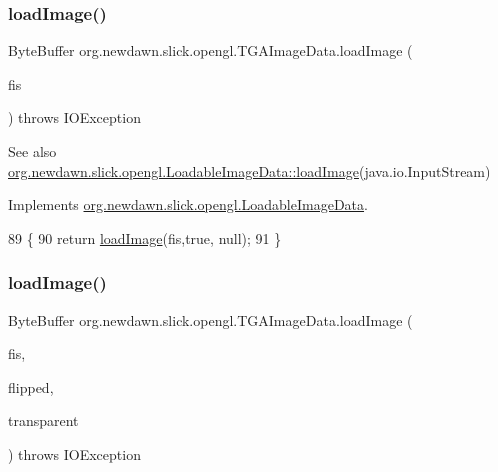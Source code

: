 \subsubsection{\texorpdfstring{load\+Image()}{loadImage()}\hspace{0.1cm}{\footnotesize\ttfamily [1/3]}}
{\footnotesize\ttfamily Byte\+Buffer org.\+newdawn.\+slick.\+opengl.\+T\+G\+A\+Image\+Data.\+load\+Image (\begin{DoxyParamCaption}\item[{Input\+Stream}]{fis }\end{DoxyParamCaption}) throws I\+O\+Exception\hspace{0.3cm}{\ttfamily [inline]}}

\begin{DoxySeeAlso}{See also}
\mbox{\hyperlink{interfaceorg_1_1newdawn_1_1slick_1_1opengl_1_1_loadable_image_data_a640021b955dde7deeeeabb5ac3738d2b}{org.\+newdawn.\+slick.\+opengl.\+Loadable\+Image\+Data\+::load\+Image}}(java.\+io.\+Input\+Stream) 
\end{DoxySeeAlso}


Implements \mbox{\hyperlink{interfaceorg_1_1newdawn_1_1slick_1_1opengl_1_1_loadable_image_data_a640021b955dde7deeeeabb5ac3738d2b}{org.\+newdawn.\+slick.\+opengl.\+Loadable\+Image\+Data}}.


\begin{DoxyCode}
89                                                                     \{
90         \textcolor{keywordflow}{return} \mbox{\hyperlink{classorg_1_1newdawn_1_1slick_1_1opengl_1_1_t_g_a_image_data_a9ac907fe85767aad15fa1c05af8fb093}{loadImage}}(fis,\textcolor{keyword}{true}, null);
91     \}
\end{DoxyCode}
\mbox{\label{classorg_1_1newdawn_1_1slick_1_1opengl_1_1_t_g_a_image_data_afeb723edb941a99d15296d28b4404c31}} 
\subsubsection{\texorpdfstring{load\+Image()}{loadImage()}\hspace{0.1cm}{\footnotesize\ttfamily [2/3]}}
{\footnotesize\ttfamily Byte\+Buffer org.\+newdawn.\+slick.\+opengl.\+T\+G\+A\+Image\+Data.\+load\+Image (\begin{DoxyParamCaption}\item[{Input\+Stream}]{fis,  }\item[{boolean}]{flipped,  }\item[{int \mbox{[}$\,$\mbox{]}}]{transparent }\end{DoxyParamCaption}) throws I\+O\+Exception\hspace{0.3cm}{\ttfamily [inline]}}

